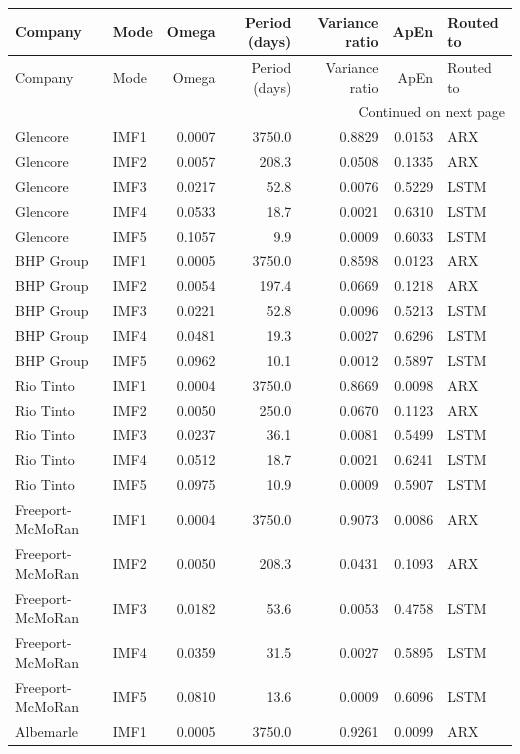 \begin{longtable}{llrrrrl}
\toprule
Company & Mode & Omega & Period (days) & Variance ratio & ApEn & Routed to \\
\midrule
\endfirsthead
\toprule
Company & Mode & Omega & Period (days) & Variance ratio & ApEn & Routed to \\
\midrule
\endhead
\midrule
\multicolumn{7}{r}{Continued on next page} \\
\midrule
\endfoot
\bottomrule
\endlastfoot
Glencore & IMF1 & 0.0007 & 3750.0 & 0.8829 & 0.0153 & ARX \\
Glencore & IMF2 & 0.0057 & 208.3 & 0.0508 & 0.1335 & ARX \\
Glencore & IMF3 & 0.0217 & 52.8 & 0.0076 & 0.5229 & LSTM \\
Glencore & IMF4 & 0.0533 & 18.7 & 0.0021 & 0.6310 & LSTM \\
Glencore & IMF5 & 0.1057 & 9.9 & 0.0009 & 0.6033 & LSTM \\
BHP Group & IMF1 & 0.0005 & 3750.0 & 0.8598 & 0.0123 & ARX \\
BHP Group & IMF2 & 0.0054 & 197.4 & 0.0669 & 0.1218 & ARX \\
BHP Group & IMF3 & 0.0221 & 52.8 & 0.0096 & 0.5213 & LSTM \\
BHP Group & IMF4 & 0.0481 & 19.3 & 0.0027 & 0.6296 & LSTM \\
BHP Group & IMF5 & 0.0962 & 10.1 & 0.0012 & 0.5897 & LSTM \\
Rio Tinto & IMF1 & 0.0004 & 3750.0 & 0.8669 & 0.0098 & ARX \\
Rio Tinto & IMF2 & 0.0050 & 250.0 & 0.0670 & 0.1123 & ARX \\
Rio Tinto & IMF3 & 0.0237 & 36.1 & 0.0081 & 0.5499 & LSTM \\
Rio Tinto & IMF4 & 0.0512 & 18.7 & 0.0021 & 0.6241 & LSTM \\
Rio Tinto & IMF5 & 0.0975 & 10.9 & 0.0009 & 0.5907 & LSTM \\
Freeport-McMoRan & IMF1 & 0.0004 & 3750.0 & 0.9073 & 0.0086 & ARX \\
Freeport-McMoRan & IMF2 & 0.0050 & 208.3 & 0.0431 & 0.1093 & ARX \\
Freeport-McMoRan & IMF3 & 0.0182 & 53.6 & 0.0053 & 0.4758 & LSTM \\
Freeport-McMoRan & IMF4 & 0.0359 & 31.5 & 0.0027 & 0.5895 & LSTM \\
Freeport-McMoRan & IMF5 & 0.0810 & 13.6 & 0.0009 & 0.6096 & LSTM \\
Albemarle & IMF1 & 0.0005 & 3750.0 & 0.9261 & 0.0099 & ARX \\

\end{longtable}
